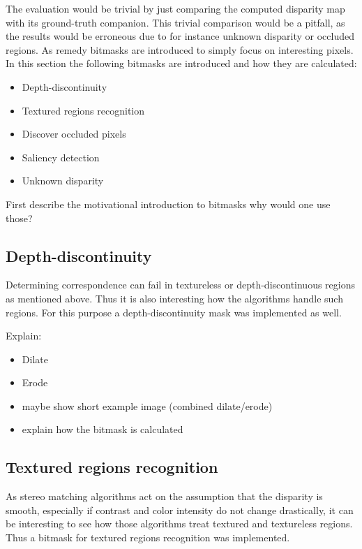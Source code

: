 The evaluation would be trivial by just comparing the computed disparity map with its ground-truth companion.
This trivial comparison would be a pitfall, as the results would be erroneous due to for instance unknown disparity or occluded regions.
As remedy bitmasks are introduced to simply focus on interesting pixels.
In this section the following bitmasks are introduced and how they are calculated:

\begin{itemize}
  \item Depth-discontinuity
  \item Textured regions recognition
  \item Discover occluded pixels
  \item Saliency detection
  \item Unknown disparity
\end{itemize}

First describe the motivational introduction to bitmasks why would one use those?

\subsection*{Depth-discontinuity}

Determining correspondence can fail in textureless or depth-discontinuous regions as mentioned above.
Thus it is also interesting how the algorithms handle such regions. For this purpose a depth-discontinuity mask was implemented as well.

Explain:

\begin{itemize}
  \item Dilate
  \item Erode
  \item maybe show short example image (combined dilate/erode)
  \item explain how the bitmask is calculated
\end{itemize}

\subsection*{Textured regions recognition}

As stereo matching algorithms act on the assumption that the disparity is smooth, especially if contrast and color intensity do not change drastically, it can be interesting to see how those algorithms treat textured and textureless regions.
Thus a bitmask for textured regions recognition was implemented.


